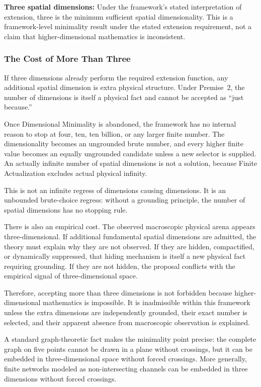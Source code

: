 \documentclass[11pt]{article}
\theoremstyle{canonstyle}
\begin{document}
\begin{keyresult}
\textbf{Three spatial dimensions:} Under the framework's stated interpretation of extension, three is the minimum sufficient spatial dimensionality. This is a framework-level minimality result under the stated extension requirement, not a claim that higher-dimensional mathematics is inconsistent.
\end{keyresult}

\subsubsection*{The Cost of More Than Three}

If three dimensions already perform the required extension function, any additional spatial dimension is extra physical structure. Under Premise~2, the number of dimensions is itself a physical fact and cannot be accepted as ``just because.''

Once Dimensional Minimality is abandoned, the framework has no internal reason to stop at four, ten, ten billion, or any larger finite number. The dimensionality becomes an ungrounded brute number, and every higher finite value becomes an equally ungrounded candidate unless a new selector is supplied. An actually infinite number of spatial dimensions is not a solution, because Finite Actualization excludes actual physical infinity.

This is not an infinite regress of dimensions causing dimensions. It is an unbounded brute-choice regress: without a grounding principle, the number of spatial dimensions has no stopping rule.

There is also an empirical cost. The observed macroscopic physical arena appears three-dimensional. If additional fundamental spatial dimensions are admitted, the theory must explain why they are not observed. If they are hidden, compactified, or dynamically suppressed, that hiding mechanism is itself a new physical fact requiring grounding. If they are not hidden, the proposal conflicts with the empirical signal of three-dimensional space.

Therefore, accepting more than three dimensions is not forbidden because higher-dimensional mathematics is impossible. It is inadmissible within this framework unless the extra dimensions are independently grounded, their exact number is selected, and their apparent absence from macroscopic observation is explained.

\begin{forthecurious}
A standard graph-theoretic fact makes the minimality point precise: the complete graph on five points cannot be drawn in a plane without crossings, but it can be embedded in three-dimensional space without forced crossings. More generally, finite networks modeled as non-intersecting channels can be embedded in three dimensions without forced crossings.
\end{forthecurious}
\end{document}
